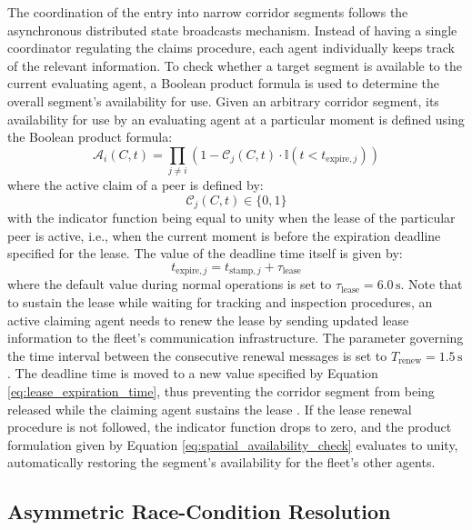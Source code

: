 The coordination of the entry into narrow corridor segments follows the asynchronous distributed state broadcasts mechanism. Instead of having a single coordinator regulating the claims procedure, each agent individually keeps track of the relevant information. To check whether a target segment is available to the current evaluating agent, a Boolean product formula is used to determine the overall segment's availability for use. Given an arbitrary corridor segment, its availability for use by an evaluating agent at a particular moment is defined using the Boolean product formula:
\begin{equation}
\mathcal{A}_i(C, t) = \prod_{j \neq i} \left( 1 - \mathcal{C}_j(C, t) \cdot \mathbb{I}\left( t < t_{\text{expire}, j} \right) \right) \label{eq:spatial_availability_check}
\end{equation}
where the active claim of a peer is defined by:
\begin{equation}
\mathcal{C}_j(C, t) \in \{0, 1\} \label{eq:active_claim_status}
\end{equation}
with the indicator function being equal to unity when the lease of the particular peer is active, i.e., when the current moment is before the expiration deadline specified for the lease. The value of the deadline time itself is given by:
\begin{equation}
t_{\text{expire}, j} = t_{\text{stamp}, j} + \tau_{\text{lease}} \label{eq:lease_expiration_time}
\end{equation}
where the default value during normal operations is set to $\tau_{\text{lease}} = 6.0\,\text{s}$. Note that to sustain the lease while waiting for tracking and inspection procedures, an active claiming agent needs to renew the lease by sending updated lease information to the fleet's communication infrastructure. The parameter governing the time interval between the consecutive renewal messages is set to $T_{\text{renew}} = 1.5\,\text{s}$. The deadline time is moved to a new value specified by Equation \ref{eq:lease_expiration_time}, thus preventing the corridor segment from being released while the claiming agent sustains the lease \cite{ghamdi2025opinion}. If the lease renewal procedure is not followed, the indicator function drops to zero, and the product formulation given by Equation \ref{eq:spatial_availability_check} evaluates to unity, automatically restoring the segment's availability for the fleet's other agents.

\subsection{Asymmetric Race-Condition Resolution}\label{sec:ch5_race_resolution}

